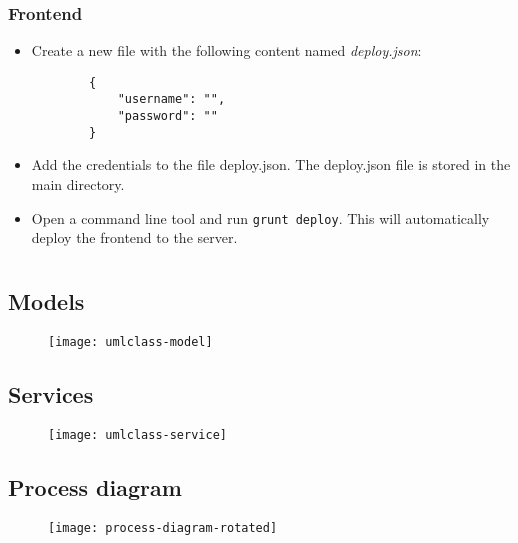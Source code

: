 \subsection{Frontend}

\begin{itemize}

    \item Create a new file with the following content named \textit{deploy.json}:
    \begin{lstlisting}
        {
            "username": "",
            "password": "" 
        }   
    \end{lstlisting}
    \item Add the credentials to the file deploy.json. The deploy.json file is stored in the main directory.
    \item Open a command line tool and run \texttt{grunt deploy}. This will automatically deploy the frontend to the server. 

\end{itemize}

\chapter{}

\section{Models}
\label{sec:app-models}

\begin{figure}[H]
    {\texttt{[image: umlclass-model]}}
\end{figure}

\section{Services}
\label{sec:app-service}

\begin{figure}[H]
    {\texttt{[image: umlclass-service]}}
\end{figure}

\section{Process diagram}
\label{sec:process-diagram-rotated}

\begin{figure}[H]
    {\texttt{[image: process-diagram-rotated]}}
\end{figure}

